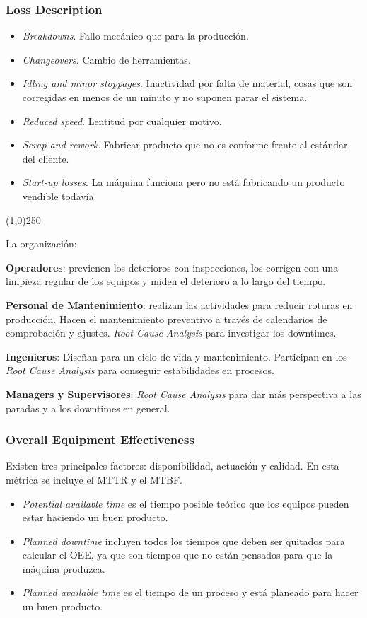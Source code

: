 \documentclass[]{article}
\begin{document}
\subsubsection{Loss Description}

\begin{itemize}
	\item \textit{Breakdowns}. Fallo mecánico que para la producción.
	\item \textit{Changeovers}. Cambio de herramientas.
	\item \textit{Idling and minor stoppages}. Inactividad por falta de material, cosas que son corregidas en menos de un minuto y no suponen parar el sistema.
	\item \textit{Reduced speed}. Lentitud por cualquier motivo.
	\item \textit{Scrap and rework}. Fabricar producto que no es conforme frente al estándar del cliente.
	\item \textit{Start-up losses}. La máquina funciona pero no está fabricando un producto vendible todavía.
\end{itemize}

\begin{center}
	\line(1,0){250}
\end{center}


La organización:

\textbf{Operadores}: previenen los deterioros con inspecciones, los corrigen con una limpieza regular de los equipos y miden el deterioro a lo largo del tiempo.

\textbf{Personal de Mantenimiento}: realizan las actividades para reducir roturas en producción. Hacen el mantenimiento preventivo a través de calendarios de comprobación y ajustes. \textit{Root Cause Analysis} para investigar los downtimes.

\textbf{Ingenieros}: Diseñan para un ciclo de vida y mantenimiento. Participan en los \textit{Root Cause Analysis} para conseguir estabilidades en procesos.

\textbf{Managers y Supervisores}: \textit{Root Cause Analysis} para dar más perspectiva a las paradas y a los downtimes en general.

\subsubsection{Overall Equipment Effectiveness}

Existen tres principales factores: disponibilidad, actuación y calidad. En esta métrica se incluye el MTTR y el MTBF.
\begin{itemize}
	\item \textit{Potential available time} es el tiempo posible teórico que los equipos pueden estar haciendo un buen producto.
	\item \textit{Planned downtime} incluyen todos los tiempos que deben ser quitados para calcular el OEE, ya que son tiempos que no están pensados para que la máquina produzca.
	\item \textit{Planned available time} es el tiempo de un proceso y está planeado para hacer un buen producto.
\end{itemize}
\end{document}

